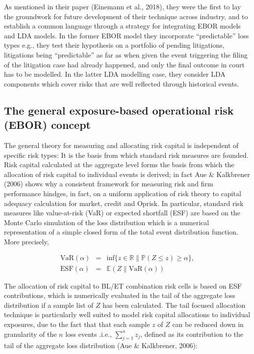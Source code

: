 \documentclass{DissertateUSU}
\begin{document}
As mentioned in their paper (Einemann et al., 2018), they were the first
to lay the groundwork for future development of their technique across
industry, and to establish a common language through a strategy for
integrating EBOR models and LDA models. In the former EBOR model they
incorporate ``predictable'' loss types e.g., they test their hypothesis
on a portfolio of pending litigations, litigations being ``predictable''
as far as when given the event triggering the filing of the litigation
case had already happened, and only the final outcome in court has to be
modelled. In the latter LDA modelling case, they consider LDA components
which cover risks that are well reflected through historical events.

\subsection{The general exposure-based operational risk (EBOR) concept}
\label{ssec:The general exposure-based operational risk (EBOR) concept}

The general theory for measuring and allocating risk capital is
independent of specific risk types: It is the basis from which standard
risk measures are founded. Risk capital calculated at the aggregate
level forms the basis from which the allocation of risk capital to
individual events is derived; in fact Aue \& Kalkbrener (2006) shows why
a consistent framework for measuring risk and firm performance hindges,
in fact, on a uniform application of risk theory to capital adequacy
calculation for market, credit and Oprisk. In particular, standard risk
measures like value-at-risk (VaR) or expected shortfall (ESF) are based
on the Monte Carlo simulation of the loss distribution which is a
numerical representation of a simple closed form of the total event
distribution function. More precisely,

\singlespacing

\begin{eqnarray}
\mbox{VaR}(\alpha) &=& \mbox{inf}\{z \in \mathbb{R}\| \mathbb{P}(Z \leq z) \geq \alpha \},\\
\mbox{ESF}(\alpha) &=& \mathbb{E}(Z\| \mbox{VaR}(\alpha))
\end{eqnarray} \doublespacing

The allocation of risk capital to BL/ET combination risk cells is based
on ESF contributions, which is numerically evaluated in the tail of the
aggregate loss distribution if a sample list of \(Z\) has been
calculated. The tail focused allocation technique is particularly well
suited to model risk capital allocations to individual exposures, due to
the fact that that each sample \(z\) of \(Z\) can be reduced down in
granularity of the \(n\) loss events .i.e., \(\sum_{j=1}^n z_j\),
defined as its contribution to the tail of the aggregate loss
distribution (Aue \& Kalkbrener, 2006):
\end{document}

